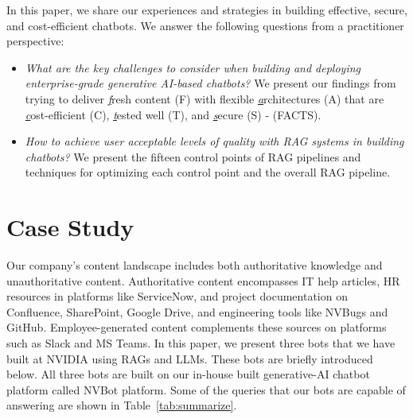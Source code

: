 \documentclass[sigconf]{acmart}
\begin{document}
In this paper, we share our experiences and strategies in building effective, secure, and cost-efficient chatbots. We answer the following questions from a practitioner perspective:

\begin{itemize}
\item \textit{What are the key challenges to consider when building and deploying enterprise-grade generative AI-based chatbots?} We present our findings from trying to deliver \textit{\underline{f}}resh content (F) with flexible \textit{\underline{a}}rchitectures (A) that are \textit{\underline{c}}ost-efficient (C), \textit{\underline{t}}ested well (T), and \textit{\underline{s}}ecure (S) - (FACTS).  
\item \textit{How to achieve user acceptable levels of quality with RAG systems in building chatbots?} We present the fifteen control points of RAG pipelines and techniques for optimizing each control point and the overall RAG pipeline.
\end{itemize}


\section{Case Study}

Our company's content landscape includes both authoritative knowledge and unauthoritative content. Authoritative content encompasses IT help articles, HR resources in platforms like ServiceNow, and project documentation on Confluence, SharePoint, Google Drive, and engineering tools like NVBugs and GitHub. Employee-generated content complements these sources on platforms such as Slack and MS Teams. In this paper, we present three bots that we have built at NVIDIA using RAGs and LLMs. These bots are briefly introduced below. All three bots are built on our in-house built generative-AI chatbot platform called NVBot platform. Some of the queries that our bots are capable of answering are shown in Table~\ref{tab:summarize}.
\end{document}
